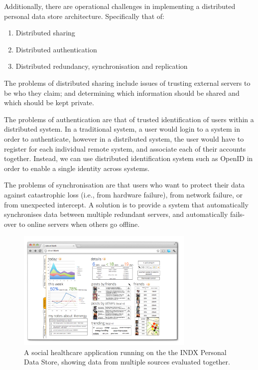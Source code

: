 \documentclass{acm_proc_article-sp}
\begin{document}
Additionally, there are operational challenges in implementing a distributed personal data store architecture. Specifically that of:

\begin{enumerate}
\item Distributed sharing
\item Distributed authentication
\item Distributed redundancy, synchronisation and replication 
\end{enumerate}

The problems of distributed sharing include issues of trusting external servers to be who they claim; and determining which information should be shared and which should be kept private.

The problems of authentication are that of trusted identification of users within a distributed system. In a traditional system, a user would login to a system in order to authenticate, however in a distributed system, the user would have to register for each individual remote system, and associate each of their accounts together. Instead, we can use distributed identification system such as OpenID in order to enable a single identity across systems.

The problems of synchronisation are that users who want to protect their data against catastrophic loss (i.e., from hardware failure), from network failure, or from unexpected intercept. A solution is to provide a system that automatically synchronises data between multiple redundant servers, and automatically fails-over to online servers when others go offline.

\begin{figure}
\centering
\includegraphics[width=8.5cm]{indx.png}
\caption{A social healthcare application running on the the INDX Personal Data Store, showing data from multiple sources evaluated together.}\label{fig:indx}
\end{figure}
\end{document}
